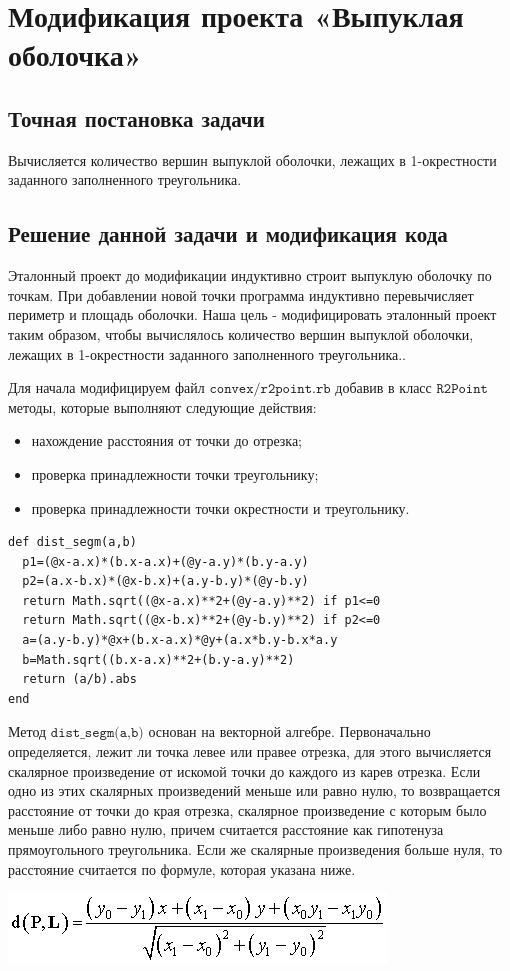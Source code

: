 \section{Модификация проекта «Выпуклая оболочка»}
\subsection*{Точная постановка задачи}
Вычисляется количество вершин выпуклой оболочки, лежащих в 1-окрестности заданного заполненного треугольника.
\subsection*{Решение данной задачи и модификация кода}
Эталонный проект до модификации индуктивно строит выпуклую оболочку по
точкам. При добавлении новой точки программа индуктивно перевычисляет периметр и
площадь оболочки. Наша цель - модифицировать эталонный проект таким 
образом, чтобы вычислялось количество вершин выпуклой оболочки, лежащих в 1-окрестности заданного заполненного треугольника..

Для начала модифицируем файл $\texttt{convex/r2point.rb}$ добавив в класс $\texttt{R2Point}$ методы,
которые выполняют следующие действия:

\medskip
\begin{itemize}
\item нахождение расстояния от точки до отрезка;
\item проверка принадлежности точки треугольнику;
\item проверка принадлежности точки окрестности и треугольнику.
\end{itemize}

\newpage
\begin{small}
\begin{verbatim}
def dist_segm(a,b)
  p1=(@x-a.x)*(b.x-a.x)+(@y-a.y)*(b.y-a.y) 
  p2=(a.x-b.x)*(@x-b.x)+(a.y-b.y)*(@y-b.y)
  return Math.sqrt((@x-a.x)**2+(@y-a.y)**2) if p1<=0 
  return Math.sqrt((@x-b.x)**2+(@y-b.y)**2) if p2<=0 
  a=(a.y-b.y)*@x+(b.x-a.x)*@y+(a.x*b.y-b.x*a.y
  b=Math.sqrt((b.x-a.x)**2+(b.y-a.y)**2)
  return (a/b).abs 
end
\end{verbatim}
\end{small}   

Метод $\texttt{dist\_segm(a,b)}$ основан на векторной алгебре. Первоначально определяется, лежит ли точка левее или правее отрезка, для этого вычисляется скалярное произведение от искомой точки до каждого из карев отрезка.
Если одно из этих скалярных произведений меньше или равно нулю, то возвращается расстояние от точки до края отрезка, скалярное произведение с которым было меньше либо равно нулю, причем считается расстояние как гипотенуза прямоугольного треугольника. Если же скалярные произведения больше нуля, то расстояние считается по формуле, которая указана ниже.
\begin{center}
\includegraphics[width=0.5\hsize]{images/distsegm}
\end{center}

